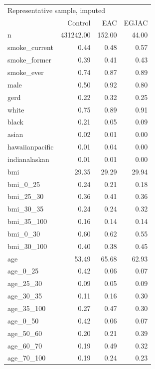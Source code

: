 \documentclass[12pt]{article}
\begin{document}
\begin{minipage}{0.50\linewidth}\scriptsize
\begin{tabular}{lrrr}
  \toprule
  \multicolumn{4}{l}{Representative sample, imputed} \\
 & Control & EAC & EGJAC \\ 
  \midrule
n & 431242.00 & 152.00 & 44.00 \\ 
  smoke\_current & 0.44 & 0.48 & 0.57 \\ 
  smoke\_former & 0.39 & 0.41 & 0.43 \\ 
  smoke\_ever & 0.74 & 0.87 & 0.89 \\ 
  male & 0.50 & 0.92 & 0.80 \\ 
  gerd & 0.22 & 0.32 & 0.25 \\ 
  white & 0.75 & 0.89 & 0.91 \\ 
  black & 0.21 & 0.05 & 0.09 \\ 
  asian & 0.02 & 0.01 & 0.00 \\ 
  hawaiianpacific & 0.01 & 0.04 & 0.00 \\ 
  indianalaskan & 0.01 & 0.01 & 0.00 \\ 
  bmi & 29.35 & 29.29 & 29.94 \\ 
  bmi\_0\_25 & 0.24 & 0.21 & 0.18 \\ 
  bmi\_25\_30 & 0.36 & 0.41 & 0.36 \\ 
  bmi\_30\_35 & 0.24 & 0.24 & 0.32 \\ 
  bmi\_35\_100 & 0.16 & 0.14 & 0.14 \\ 
  bmi\_0\_30 & 0.60 & 0.62 & 0.55 \\ 
  bmi\_30\_100 & 0.40 & 0.38 & 0.45 \\ 
  age & 53.49 & 65.68 & 62.93 \\ 
  age\_0\_25 & 0.42 & 0.06 & 0.07 \\ 
  age\_25\_30 & 0.09 & 0.05 & 0.09 \\ 
  age\_30\_35 & 0.11 & 0.16 & 0.30 \\ 
  age\_35\_100 & 0.27 & 0.47 & 0.30 \\ 
  age\_0\_50 & 0.42 & 0.06 & 0.07 \\ 
  age\_50\_60 & 0.20 & 0.21 & 0.39 \\ 
  age\_60\_70 & 0.19 & 0.49 & 0.32 \\ 
  age\_70\_100 & 0.19 & 0.24 & 0.23 \\ 
   \bottomrule
\end{tabular}
\end{minipage}
\end{document}
